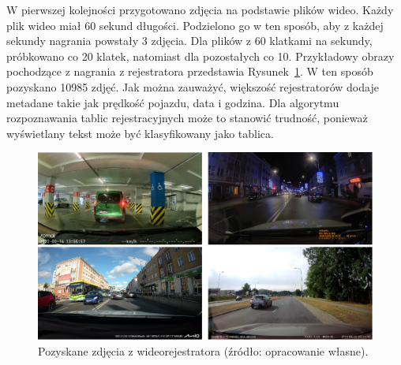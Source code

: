 W pierwszej kolejności przygotowano zdjęcia na podstawie plików wideo.
Każdy plik wideo miał 60 sekund długości.
Podzielono go w ten sposób, aby z każdej sekundy nagrania powstały 3 zdjęcia.
Dla plików z 60 klatkami na sekundy, próbkowano co 20 klatek, natomiast dla pozostałych co 10.
Przykładowy obrazy pochodzące z nagrania z rejestratora przedstawia Rysunek~\ref{fig:captured_frame}.
W ten sposób pozyskano 10985 zdjęć.
Jak można zauważyć, większość rejestratorów dodaje metadane takie jak prędkość pojazdu, data i godzina.
Dla algorytmu rozpoznawania tablic rejestracyjnych może to stanowić trudność, ponieważ wyświetlany tekst może być klasyfikowany jako tablica.
\begin{figure}[!ht]
    \centering
    \includegraphics[scale=0.4]{Pictures/captured_frames}
    \caption{Pozyskane zdjęcia z wideorejestratora (źródło: opracowanie własne).}
    \label{fig:captured_frame}
\end{figure}
\FloatBarrier

